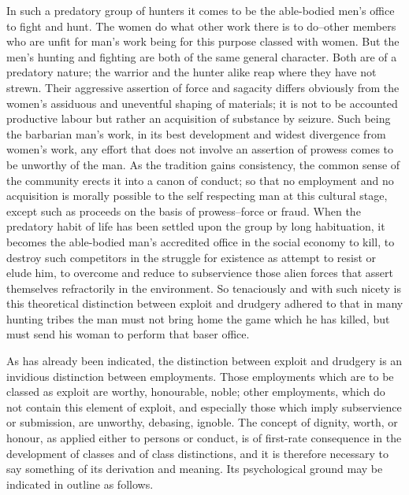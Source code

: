\documentclass[12pt]{report}
\begin{document}
In such a predatory group of hunters it comes to be the able-bodied
men's office to fight and hunt. The women do what other work there is
to do--other members who are unfit for man's work being for this purpose
classed with women. But the men's hunting and fighting are both of the
same general character. Both are of a predatory nature; the warrior
and the hunter alike reap where they have not strewn. Their aggressive
assertion of force and sagacity differs obviously from the women's
assiduous and uneventful shaping of materials; it is not to be accounted
productive labour but rather an acquisition of substance by seizure.
Such being the barbarian man's work, in its best development and widest
divergence from women's work, any effort that does not involve an
assertion of prowess comes to be unworthy of the man. As the tradition
gains consistency, the common sense of the community erects it into a
canon of conduct; so that no employment and no acquisition is morally
possible to the self respecting man at this cultural stage, except such
as proceeds on the basis of prowess--force or fraud. When the predatory
habit of life has been settled upon the group by long habituation, it
becomes the able-bodied man's accredited office in the social economy
to kill, to destroy such competitors in the struggle for existence as
attempt to resist or elude him, to overcome and reduce to subservience
those alien forces that assert themselves refractorily in the
environment. So tenaciously and with such nicety is this theoretical
distinction between exploit and drudgery adhered to that in many hunting
tribes the man must not bring home the game which he has killed, but
must send his woman to perform that baser office.

As has already been indicated, the distinction between exploit and
drudgery is an invidious distinction between employments. Those
employments which are to be classed as exploit are worthy, honourable,
noble; other employments, which do not contain this element of exploit,
and especially those which imply subservience or submission, are
unworthy, debasing, ignoble. The concept of dignity, worth, or honour,
as applied either to persons or conduct, is of first-rate consequence
in the development of classes and of class distinctions, and it is
therefore necessary to say something of its derivation and meaning. Its
psychological ground may be indicated in outline as follows.
\end{document}
